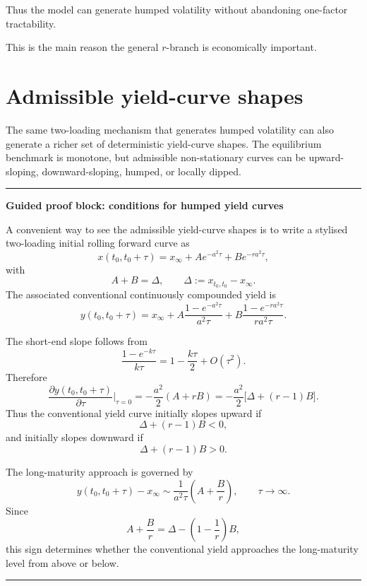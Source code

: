 \documentclass[11pt]{article}
\theoremstyle{plainbreak}
\newenvironment{proofblock}[1]{%
    \vspace{0.5em}\hrule\vspace{0.7em}%
    {\bfseries Guided proof block: #1}\par\vspace{0.2em}%
}{%
    \vspace{0.5em}\hrule\vspace{0.7em}%
}
\begin{document}
Thus the model can generate humped volatility without abandoning one-factor tractability.

This is the main reason the general \(r\)-branch is economically important.


\section{Admissible yield-curve shapes}

The same two-loading mechanism that generates humped volatility can also generate a richer set of deterministic yield-curve shapes. The equilibrium benchmark is monotone, but admissible non-stationary curves can be upward-sloping, downward-sloping, humped, or locally dipped.

\begin{proofblock}{conditions for humped yield curves}
A convenient way to see the admissible yield-curve shapes is to write a stylised two-loading initial rolling forward curve as
\begin{equation*}
    x(t_0,t_0+\tau)=x_\infty+A e^{-a^2\tau}+B e^{-ra^2\tau},
\end{equation*}
with
\begin{equation*}
    A+B=\Delta,
    \qquad
    \Delta:=x_{t_0,t_0}-x_\infty.
\end{equation*}
The associated conventional continuously compounded yield is
\begin{equation*}
    y(t_0,t_0+\tau)
    =x_\infty
    +A\frac{1-e^{-a^2\tau}}{a^2\tau}
    +B\frac{1-e^{-ra^2\tau}}{ra^2\tau}.
\end{equation*}

The short-end slope follows from
\begin{equation*}
    \frac{1-e^{-k\tau}}{k\tau}=1-\frac{k\tau}{2}+O(\tau^2).
\end{equation*}
Therefore
\begin{equation*}
    \frac{\partial y(t_0,t_0+\tau)}{\partial \tau}\bigg|_{\tau=0}
    =-\frac{a^2}{2}(A+rB)
    =-\frac{a^2}{2}\bigl[\Delta+(r-1)B\bigr].
\end{equation*}
Thus the conventional yield curve initially slopes upward if
\begin{equation*}
    \Delta+(r-1)B<0,
\end{equation*}
and initially slopes downward if
\begin{equation*}
    \Delta+(r-1)B>0.
\end{equation*}

The long-maturity approach is governed by
\begin{equation*}
    y(t_0,t_0+\tau)-x_\infty
    \sim
    \frac{1}{a^2\tau}\left(A+\frac{B}{r}\right),
    \qquad \tau\to\infty.
\end{equation*}
Since
\begin{equation*}
    A+\frac{B}{r}
    =\Delta-\left(1-\frac{1}{r}\right)B,
\end{equation*}
this sign determines whether the conventional yield approaches the long-maturity level from above or below.


\end{proofblock}
\end{document}
